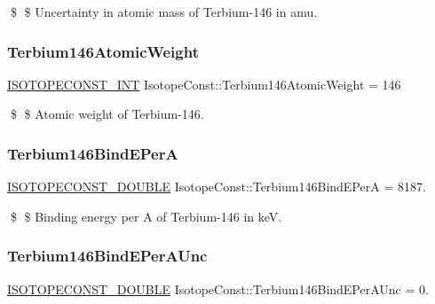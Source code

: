 \$ \$ Uncertainty in atomic mass of Terbium-\/146 in amu. \mbox{\label{group___isotope_const-_terbium-_tb146_gac810fcbfc2b29bb2c0643a1f87700c1c}} 
\subsubsection{\texorpdfstring{Terbium146\+Atomic\+Weight}{Terbium146AtomicWeight}}
{\footnotesize\ttfamily \mbox{\hyperlink{group___isotope_const-_macros_ga5f18360b3e99483a35c32d789e62621c}{I\+S\+O\+T\+O\+P\+E\+C\+O\+N\+S\+T\+\_\+\+I\+NT}} Isotope\+Const\+::\+Terbium146\+Atomic\+Weight = 146}

\$ \$ Atomic weight of Terbium-\/146. \mbox{\label{group___isotope_const-_terbium-_tb146_ga345aeb5c1d023137bfc272a6d7250103}} 
\subsubsection{\texorpdfstring{Terbium146\+Bind\+E\+PerA}{Terbium146BindEPerA}}
{\footnotesize\ttfamily \mbox{\hyperlink{group___isotope_const-_macros_ga8f45a7272ce02c0b4c65c44636ed719a}{I\+S\+O\+T\+O\+P\+E\+C\+O\+N\+S\+T\+\_\+\+D\+O\+U\+B\+LE}} Isotope\+Const\+::\+Terbium146\+Bind\+E\+PerA = 8187.}

\$ \$ Binding energy per A of Terbium-\/146 in keV. \mbox{\label{group___isotope_const-_terbium-_tb146_ga50e54448393b257a221b326f3d83cf3f}} 
\subsubsection{\texorpdfstring{Terbium146\+Bind\+E\+Per\+A\+Unc}{Terbium146BindEPerAUnc}}
{\footnotesize\ttfamily \mbox{\hyperlink{group___isotope_const-_macros_ga8f45a7272ce02c0b4c65c44636ed719a}{I\+S\+O\+T\+O\+P\+E\+C\+O\+N\+S\+T\+\_\+\+D\+O\+U\+B\+LE}} Isotope\+Const\+::\+Terbium146\+Bind\+E\+Per\+A\+Unc = 0.}


